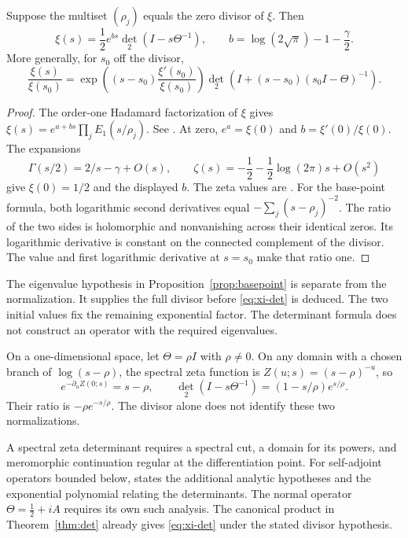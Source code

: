 \documentclass[11pt]{article}
\begin{document}
\begin{proposition}\label{prop:basepoint}
Suppose the multiset $(\rho_j)$ equals the zero divisor of $\xi$.
Then
\begin{equation}\label{eq:xi-det}
 \xi(s)=\frac12e^{bs}\det_2(I-s\Theta^{-1}),\qquad
 b=\log(2\sqrt\pi)-1-\frac\gamma2.
\end{equation}
More generally, for $s_0$ off the divisor,
\begin{equation}\label{eq:basepoint}
 \frac{\xi(s)}{\xi(s_0)}
  =\exp\left((s-s_0)\frac{\xi'(s_0)}{\xi(s_0)}\right)
       \det_2\left(I+(s-s_0)(s_0I-\Theta)^{-1}\right).
\end{equation}
\end{proposition}
\begin{proof}
The order-one Hadamard factorization of $\xi$ gives
$\xi(s)=e^{a+bs}\prod_j E_1(s/\rho_j)$.
See \cite[proof of Theorem~1, p.~9]{lagarias}.
At zero, $e^a=\xi(0)$ and $b=\xi'(0)/\xi(0)$.
The expansions
\[
 \Gamma(s/2)=2/s-\gamma+O(s),\qquad
 \zeta(s)=-\frac12-\frac12\log(2\pi)s+O(s^2)
\]
give $\xi(0)=1/2$ and the displayed $b$.
The zeta values are \cite[Eqs.~25.6.1, 25.6.11]{dlmf}.
For the base-point formula, both logarithmic second derivatives equal
$-\sum_j(s-\rho_j)^{-2}$.
The ratio of the two sides is holomorphic and nonvanishing across their identical zeros.
Its logarithmic derivative is constant on the connected complement of the divisor.
The value and first logarithmic derivative at $s=s_0$ make that ratio one.
\end{proof}

The eigenvalue hypothesis in Proposition~\ref{prop:basepoint} is separate from the normalization.
It supplies the full divisor before \eqref{eq:xi-det} is deduced.
The two initial values fix the remaining exponential factor.
The determinant formula does not construct an operator with the required eigenvalues.

\begin{example}
On a one-dimensional space, let $\Theta=\rho I$ with $\rho\ne0$.
On any domain with a chosen branch of $\log(s-\rho)$, the spectral zeta function is
$Z(u;s)=(s-\rho)^{-u}$, so
\[
 e^{-\partial_u Z(0;s)}=s-\rho,
 \qquad
 \det_2(I-s\Theta^{-1})=(1-s/\rho)e^{s/\rho}.
\]
Their ratio is $-\rho e^{-s/\rho}$.
The divisor alone does not identify these two normalizations.
\end{example}

A spectral zeta determinant requires a spectral cut, a domain for its powers,
and meromorphic continuation regular at the differentiation point.
For self-adjoint operators bounded below, \cite[Theorem~4.5, Eq.~(4.7)]{hartmann-lesch}
states the additional analytic hypotheses and the exponential polynomial relating the determinants.
The normal operator $\Theta=\tfrac12+iA$ requires its own such analysis.
The canonical product in Theorem~\ref{thm:det} already gives
\eqref{eq:xi-det} under the stated divisor hypothesis.
\end{document}
